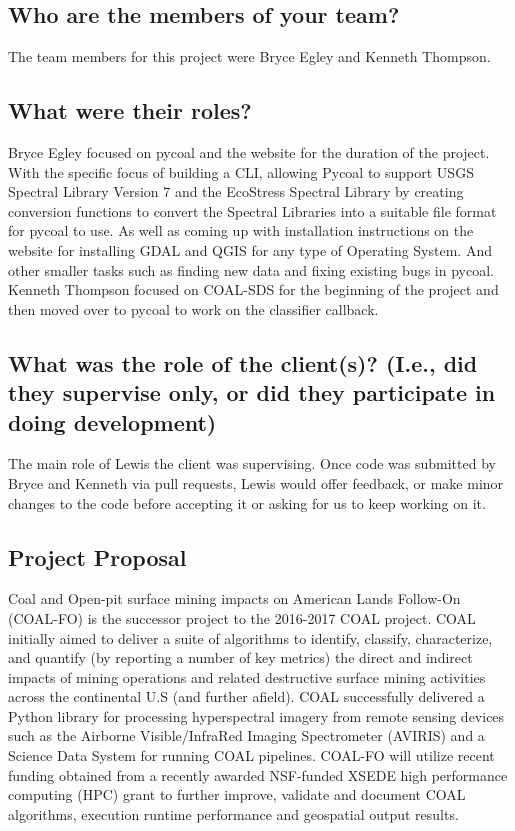 \documentclass[onecolumn, draftclsnofoot,10pt, compsoc]{IEEEtran}
\begin{document}
\subsection{Who are the members of your team?}
The team members for this project were Bryce Egley and Kenneth Thompson.
\subsection{What were their roles?}
Bryce Egley focused on pycoal and the website for the duration of the project. With the specific focus of building a CLI, allowing Pycoal to support USGS Spectral Library Version 7 and the EcoStress Spectral Library by creating conversion functions to convert the Spectral Libraries into a suitable file format for pycoal to use. As well as coming up with installation instructions on the website for installing GDAL and QGIS for any type of Operating System. And other smaller tasks such as finding new data and fixing existing bugs in pycoal.
\newline
Kenneth Thompson focused on COAL-SDS for the beginning of the project and then moved over to pycoal to work on the classifier callback. 
\subsection{What was the role of the client(s)? (I.e., did they supervise only, or did they participate in doing development)}
The main role of Lewis the client was supervising. Once code was submitted by Bryce and Kenneth via pull requests, Lewis would offer feedback, or make minor changes to the code before accepting it or asking for us to keep working on it.


\subsection{Project Proposal}
Coal and Open-pit surface mining impacts on American Lands Follow-On (COAL-FO) is the successor project to the 2016-2017 COAL project. COAL initially aimed to deliver a suite of algorithms to identify, classify, characterize, and quantify (by reporting a number of key metrics) the direct and indirect impacts of mining operations and related destructive surface mining activities across the continental U.S (and further afield). COAL successfully delivered a Python library for processing hyperspectral imagery from remote sensing devices such as the Airborne Visible/InfraRed Imaging Spectrometer (AVIRIS) and a Science Data System for running COAL pipelines. COAL-FO will utilize recent funding obtained from a recently awarded NSF-funded XSEDE high performance computing (HPC) grant to further improve, validate and document COAL algorithms, execution runtime performance and geospatial output results.
\end{document}
